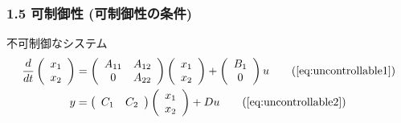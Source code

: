 \begin{frame}[t]
\frametitle{1.5 可制御性 (可制御性の条件)}
不可制御なシステム
\begin{align}
 \frac{d}{dt}
  \left(\begin{array}{c}
         {x}_1 \\
   {x}_2
  \end{array}\right)
  &=
  \left(\begin{array}{cc}
         {A}_{11} & {A}_{12} \\
       0        & {A}_{22}
  \end{array}\right)
  \left(\begin{array}{c}
         {x}_1 \\
   {x}_2
  \end{array}\right)
  +
  \left(\begin{array}{c}
         {B}_1 \\
   0
  \end{array}\right)
  u
\tag{\ref{eq:uncontrollable1}}\\
 y &=
  \left(\begin{array}{cc}
         {C}_1 & {C}_2
  \end{array}\right)
  \left(\begin{array}{c}
         {x}_1 \\
   {x}_2
  \end{array}\right)
  + D u
\tag{\ref{eq:uncontrollable2}}
\end{align}


\end{frame}
